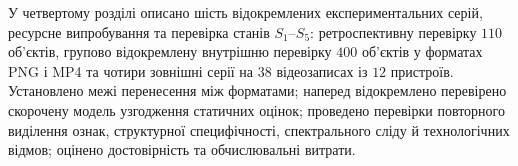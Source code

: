 У четвертому розділі описано шість відокремлених експериментальних серій, ресурсне випробування та перевірка станів $S_1$--$S_5$: ретроспективну перевірку $110$ об’єктів, групово відокремлену внутрішню перевірку $400$ об’єктів у форматах PNG і MP4 та чотири зовнішні серії на $38$ відеозаписах із $12$ пристроїв. Установлено межі перенесення між форматами; наперед відокремлено перевірено скорочену модель узгодження статичних оцінок; проведено перевірки повторного виділення ознак, структурної специфічності, спектрального сліду й технологічних відмов; оцінено достовірність та обчислювальні витрати.

\clearpage
